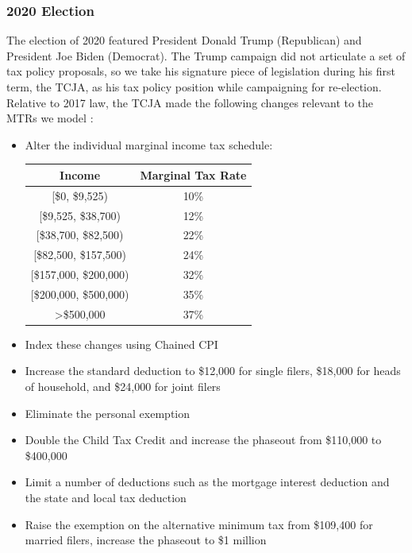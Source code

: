 \documentclass[12pt]{article}
\begin{document}
\subsubsection{2020 Election}

The election of 2020 featured President Donald Trump (Republican) and President Joe Biden (Democrat).  The Trump campaign did not articulate a set of tax policy proposals, so we take his signature piece of legislation during his first term, the TCJA, as his tax policy position while campaigning for re-election.  Relative to 2017 law, the TCJA made the following changes relevant to the MTRs we model \citep{TCJA}:
\begin{itemize}
    \item Alter the individual marginal income tax schedule:
    \begin{center}
    \begin{tabular}{cc}
     \toprule
     Income & Marginal Tax Rate \\
     \midrule
     {[\$0, \$9,525)} & 10\% \\
     {[\$9,525, \$38,700)} & 12\% \\
     {[\$38,700, \$82,500)} & 22\% \\
     {[\$82,500, \$157,500)} & 24\% \\
     {[\$157,000, \$200,000)} & 32\% \\
     {[\$200,000, \$500,000)} & 35\% \\
     >\$500,000 & 37\% \\
     \bottomrule
    \end{tabular}
    \end{center}
    \item Index these changes using Chained CPI
    \item Increase the standard deduction to \$12,000 for single filers, \$18,000 for heads of household, and \$24,000 for joint filers
    \item Eliminate the personal exemption
    \item Double the Child Tax Credit and increase the phaseout from \$110,000 to \$400,000
    \item Limit a number of deductions such as the mortgage interest deduction and the state and local tax deduction
    \item Raise the exemption on the alternative minimum tax from \$109,400 for married filers, increase the phaseout to \$1 million
\end{itemize}
\end{document}
